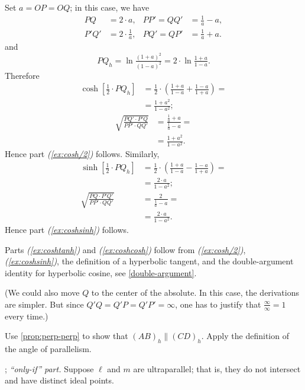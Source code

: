 Set $a=OP=OQ$; in this case, we have
\begin{align*}
PQ&=2\cdot a,
&
PP'=QQ'&=\tfrac1a-a,
\\
P'Q'&=2\cdot \tfrac1a,
&
PQ'=QP'&=\tfrac1a+a.
\end{align*}
and 
\[PQ_h=\ln \tfrac{(1+a)^2}{(1-a)^2}=2\cdot \ln \tfrac{1+a}{1-a}.\]
Therefore
\begin{align*}
\cosh[\tfrac12\cdot PQ_h]
&=\tfrac12\cdot(\tfrac{1+a}{1-a}+\tfrac{1-a}{1+a})=
\\
&=\tfrac{1+a^2}{1-a^2};
\end{align*} 
\begin{align*}
\sqrt{\frac{PQ'\cdot P'Q}{PP'\cdot QQ'}}
&=\frac{\frac1a+a}{\frac1a-a}=
\\
&=\tfrac{1+a^2}{1-a^2}.
\end{align*} 
Hence part \textit{(\ref{ex:cosh/2})} follows.
Similarly,
\begin{align*}
\sinh[\tfrac12\cdot PQ_h]
&=\tfrac12\cdot\left(\tfrac{1+a}{1-a}-\tfrac{1-a}{1+a}\right)=
\\
&=\tfrac{2\cdot a}{1-a^2};
\\
\sqrt{\frac{PQ\cdot P'Q'}{PP'\cdot QQ'}}
&=\frac{2}{\frac1a-a}=
\\
&=\tfrac{2\cdot a}{1-a^2}.
\end{align*} 
Hence part \textit{(\ref{ex:coshsinh})} follows.

Parts \textit{(\ref{ex:coshtanh})} and \textit{(\ref{ex:coshcosh})} follow from \textit{(\ref{ex:cosh/2})}, \textit{(\ref{ex:coshsinh})}, the definition of a hyperbolic tangent, and the double-argument identity for hyperbolic cosine, see \ref{double-argument}.

(We could also move $Q$ to the center of the absolute.
In this case, the derivations are simpler.
But since $Q'Q=Q'P=Q'P'=\infty$, one has to justify that $\tfrac\infty\infty=1$ every time.)

\setcounter{eqtn}{0}

Use \ref{prop:perp-perp} to show that $(AB)_h\parallel (CD)_h$.
Apply the definition of the angle of parallelism.

\parbf{\ref{ex:ultra-parallel}}; \textit{``only-if'' part.}
Suppose $\ell$ and $m$ are ultraparallel; that is, they do not intersect and have distinct ideal points.

